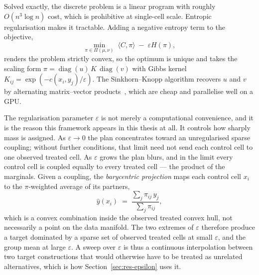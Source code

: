 Solved exactly, the discrete problem is a linear program with roughly $O(n^3 \log n)$ cost, which is
prohibitive at single-cell scale. Entropic regularisation makes it tractable. Adding a negative
entropy term to the objective,
\begin{equation}
  \min_{\pi \in \Pi(\mu,\nu)} \; \langle C, \pi \rangle \;-\; \varepsilon H(\pi),
\end{equation}
renders the problem strictly convex, so the optimum is unique and takes the scaling form
$\pi = \operatorname{diag}(u)\,K\,\operatorname{diag}(v)$ with Gibbs kernel
$K_{ij} = \exp(-c(x_i,y_j)/\varepsilon)$. The Sinkhorn--Knopp algorithm recovers $u$ and $v$ by
alternating matrix--vector products~\cite{cuturi}, which are cheap and parallelise well on a GPU.

The regularisation parameter $\varepsilon$ is not merely a computational convenience, and it is the
reason this framework appears in this thesis at all. It controls how sharply mass is assigned. As
$\varepsilon \rightarrow 0$ the plan concentrates toward an unregularised sparse coupling; without
further conditions, that limit need not send each control cell to one observed treated cell. As
$\varepsilon$ grows the plan blurs, and in the limit every control cell is coupled equally to every
treated cell --- the product of the marginals. Given a coupling, the \emph{barycentric projection}
maps each control cell $x_i$ to the $\pi$-weighted average of its partners,
\begin{equation}
  \hat{y}(x_i) \;=\; \frac{\sum_j \pi_{ij}\, y_j}{\sum_j \pi_{ij}},
\end{equation}
which is a convex combination inside the observed treated convex hull, not necessarily a point on
the data manifold. The two extremes of $\varepsilon$ therefore produce a target dominated by a
sparse set of observed treated cells at small $\varepsilon$, and the group mean at large
$\varepsilon$. A sweep over $\varepsilon$ is thus a continuous interpolation between two target
constructions that would otherwise have to be treated as unrelated alternatives, which is how
Section~\ref{sec:res-epsilon} uses it.

